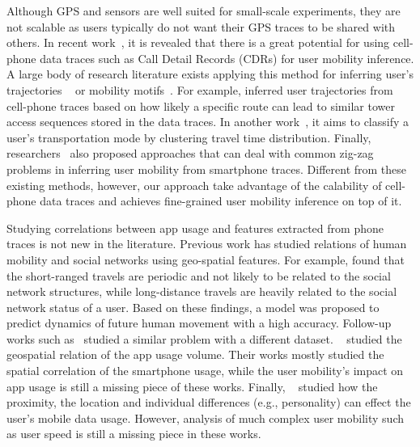 Although GPS and sensors are well suited for small-scale experiments, they are not scalable as users typically do not want their GPS traces to be shared with others. In recent work~\cite{rose2006mobile},  it is revealed that there is a great potential for using cell-phone data traces such as Call Detail Records (CDRs) for user mobility inference. A large body of research literature exists applying this method for inferring user's trajectories ~\cite{smoreda2013spatiotemporal, hoteit2014estimating, widhalm2015discovering, Alsolami2012Auth, jiang2013review, bekhor2015investigation} or mobility motifs~\cite{wang2014mobile, gambs2012next}. For example, \cite{Alsolami2012Auth, jiang2013review} inferred user trajectories from cell-phone traces based on how likely a specific route can lead to similar tower access sequences stored in the data traces. In another work~\cite{wang2010transportation}, it aims to classify a user's transportation mode by clustering travel time distribution. Finally, researchers~\cite{bekhor2015investigation} also proposed approaches that can deal with common zig-zag problems in inferring user mobility from smartphone traces.
Different from these existing methods, however, our approach take advantage of the calability of cell-phone data traces and achieves fine-grained user mobility inference on top of it.


Studying correlations between app usage and features extracted from phone traces is not new in the literature. Previous work has studied relations of human mobility and social networks using geo-spatial features. For example, \cite{cho2011friendship} found that the short-ranged travels are periodic and not likely to be related to the social network structures, while long-distance travels are heavily related to the social network status of a user. Based on these findings, a model was proposed to predict dynamics of future human movement with a high accuracy. Follow-up works such as~\cite{Noulas11} studied a similar problem with a different dataset. ~\cite{shafiq2012characterizing,yang2015characterizing} studied the geospatial relation of the app usage volume. Their works mostly studied the spatial correlation of the smartphone usage, while the user mobility's impact on app usage is still a missing piece of these works. Finally, ~\cite{meng2014analyzing} studied how the proximity, the location and individual differences (e.g., personality) can effect the user's mobile data usage. However, analysis of much complex user mobility such as user speed is still a missing piece in these works.
